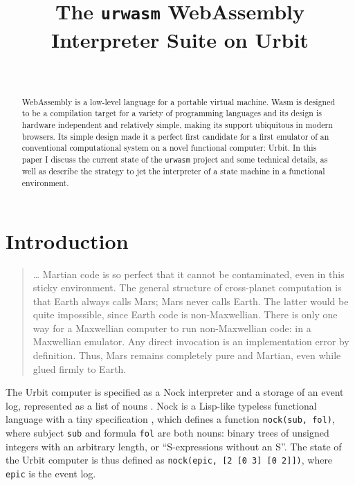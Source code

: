 \documentclass[twoside]{article}
\title{The \texttt{urwasm} WebAssembly Interpreter Suite on Urbit}
\author{\authorname~\authorpatp \\ \affiliation}
\date{}
\begin{document}
\maketitle
\thispagestyle{firststyle}

\begin{abstract}
\noindent
WebAssembly is a low-level language for a portable virtual machine. Wasm is designed to be a compilation target for a variety of programming languages and its design is hardware independent and relatively simple, making its support ubiquitous in modern browsers. Its simple design made it a perfect first candidate for a first emulator of an conventional computational system on a novel functional computer: Urbit. In this paper I discuss the current state of the \texttt{urwasm} project and some technical details, as well as describe the strategy to jet the interpreter of a state machine in a functional environment.
\end{abstract}

\setcounter{page}{133}

\tableofcontents

\section{Introduction}

\begin{quote}
\ldots{} Martian code is so perfect that it cannot be contaminated, even in this sticky environment. The general structure of cross-planet computation is that Earth always calls Mars; Mars never calls Earth. The latter would be quite impossible, since Earth code is non-Maxwellian. There is only one way for a Maxwellian computer to run non-Maxwellian code: in a Maxwellian emulator. Any direct invocation is an implementation error by definition. Thus, Mars remains completely pure and Martian, even while glued firmly to Earth.
\citep{Yarvin2010}
\end{quote}

The Urbit computer is specified as a Nock interpreter and a storage of an event log, represented as a list of nouns \citep{Whitepaper}. Nock is a Lisp-like typeless functional language with a tiny specification \citep{Nock4K}, which defines a function \lstinline[style=inlinecode]{nock(sub, fol)}, where subject \lstinline[style=inlinecode]{sub} and formula \lstinline[style=inlinecode]{fol} are both nouns: binary trees of unsigned integers with an arbitrary length, or “S-expressions without an S”. The state of the Urbit computer is thus defined as \lstinline[style=inlinecode]{nock(epic, [2 [0 3] [0 2]])}, where \lstinline[style=inlinecode]{epic} is the event log.
\end{document}
